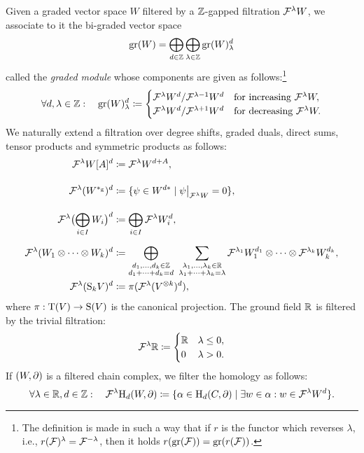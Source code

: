 \documentclass[\MainFolder/Text.tex]{subfiles}
\begin{document}
\begin{Definition}[Filtrations]
Given a graded vector space $W$ filtered by a $\mathbb{Z}$-gapped filtration $\mathcal{F}^\lambda W$, we associate to it the bi-graded vector space 
\[ \operatorname{\mathrm{gr}}(W) = \bigoplus_{d\in\mathbb{Z}}\bigoplus_{\lambda\in \mathbb{Z}} \operatorname{\mathrm{gr}}(W)_\lambda^d \]
called the \emph{graded module} whose components are given as follows:\footnote{The definition is made in such a way that if $r$ is the functor which reverses $\lambda$, i.e., $r(\mathcal{F})^\lambda = \mathcal{F}^{-\lambda}$, then it holds $r(\operatorname{\mathrm{gr}}(\mathcal{F})) = \operatorname{\mathrm{gr}}(r(\mathcal{F}))$. }
\[ \forall d, \lambda\in \mathbb{Z}: \quad \operatorname{\mathrm{gr}}(W)_\lambda^d \coloneqq \begin{cases}
                   \mathcal{F}^\lambda W^d /\mathcal{F}^{\lambda-1} W^d & \text{for increasing }\mathcal{F}^\lambda W,\\
                   \mathcal{F}^{\lambda} W^d / \mathcal{F}^{\lambda+1} W^d & \text{for decreasing } \mathcal{F}^\lambda W.
                 \end{cases}\]
We naturally extend a filtration over degree shifts, graded duals, direct sums, tensor products and symmetric products as follows: \allowdisplaybreaks
\begin{align*}
\Filtr^\lambda W[A]^d &\coloneqq \Filtr^\lambda W^{d+A},\\[3.5\jot]
\Filtr^\lambda (W^{\GD})^d &\coloneqq \{\psi\in W^{d*} \mid \Restr{\psi}{\Filtr^\lambda W} = 0\}, \\[3.5\jot]
\Filtr^\lambda\bigl(\bigoplus_{i\in I} W_i\bigr)^d &\coloneqq \bigoplus_{i\in I} \Filtr^{\lambda} W_i^d, \\[2\jot]
\Filtr^{\lambda}(W_1 \otimes \dotsb \otimes W_k)^d &\coloneqq \bigoplus_{\substack{d_1, \dotsc, d_k\in \Z \\ d_1 + \dotsb + d_k = d}}\ \sum_{\substack{\lambda_1, \dotsc, \lambda_k \in \R \\ \lambda_1 + \dotsb + \lambda_k = \lambda}} \Filtr^{\lambda_1} W_1^{d_1} \otimes \dotsb \otimes \Filtr^{\lambda_k} W_k^{d_k},\\
\Filtr^\lambda (\Sym_k V)^d &\coloneqq \pi(\Filtr^\lambda(V^{\otimes k})^d),
\end{align*}
where $\pi: \mathrm{T}(V) \rightarrow \mathrm{S}(V)$ is the canonical projection. The ground field $\mathbb{R}$ is filtered by the trivial filtration:
\begin{equation}\label{Eq:TrivFiltr}
\mathcal{F}^\lambda \mathbb{R} \coloneqq \begin{cases} \mathbb{R} & \lambda\le 0, \\ 0 & \lambda >0. \end{cases}
\end{equation}
If $(W,\partial)$ is a filtered chain complex, we filter the homology as follows:
\[ \forall \lambda \in \mathbb{R}, d\in \mathbb{Z}: \quad \mathcal{F}^\lambda \mathrm{H}_d(W,\partial) \coloneqq \{\alpha \in \mathrm{H}_d(C,\partial) \mid \exists w\in \alpha: w\in \mathcal{F}^\lambda W^d \}. \]
\end{Definition}
\end{document}
